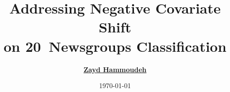 \documentclass[11pt,dvipsnames,usenames,aspectratio=169]{beamer}  %
\title[Negative Covariate Shift]{Addressing Negative Covariate Shift \\ on 20~Newsgroups Classification}
\author[Zayd Hammoudeh]{%
  \href{mailto:zayd@cs.uoregon.edu}{\textbf{Zayd Hammoudeh}}\inst{1}  %
}
\institute[Univ.\ Oregon]{%
  \textsuperscript{1}\textbf{University of Oregon}\\
  Eugene, OR, USA\\
  \texttt{\href{mailto:zayd@cs.uoregon.edu}{zayd@cs.uoregon.edu}}
}
\date{\today}
\begin{document}
  \begin{frame}
    \titlepage
  \end{frame}

  
\end{document}
